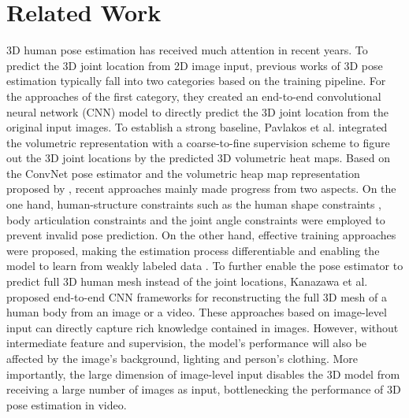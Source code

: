 \documentclass[journal]{IEEEtran}
\begin{document}
 \section{Related Work}
3D human pose estimation has received much attention in recent years. To predict the 3D joint location from 2D image input, previous works of 3D pose estimation typically fall into two categories based on the training pipeline. For the approaches of the first category, they created an end-to-end convolutional neural network (CNN) model to directly predict the 3D joint location from the original input images. To establish a strong baseline, Pavlakos et al. \cite{pavlakos2017coarse} integrated the volumetric representation with a coarse-to-fine supervision scheme to figure out the 3D joint locations by the predicted 3D volumetric heat maps. Based on the ConvNet pose estimator and the volumetric heap map representation proposed by \cite{pavlakos2017coarse}, recent approaches mainly made progress from two aspects. On the one hand, human-structure constraints such as the human shape constraints \cite{zhou2017towards}, body articulation constraints \cite{yang20183d} and the joint angle constraints \cite{dabral2018learning} were employed to prevent invalid pose prediction. On the other hand, effective training approaches were proposed, making the estimation process differentiable \cite{sun2018integral} and enabling the model to learn from weakly labeled data \cite{pavlakos2018ordinal,kocabas2019self}. To further enable the pose estimator to predict full 3D human mesh instead of the joint locations, Kanazawa et al. \cite{kanazawa2018end,kanazawa2019learning} proposed end-to-end CNN frameworks for reconstructing the full 3D mesh of a human body from an image or a video. These approaches based on image-level input can directly capture rich knowledge contained in images. However, without intermediate feature and supervision, the model's performance will also be affected by the image's background, lighting and person's clothing. More importantly, the large dimension of image-level input disables the 3D model from receiving a large number of images as input, bottlenecking the performance of 3D pose estimation in video.     
\end{document}
